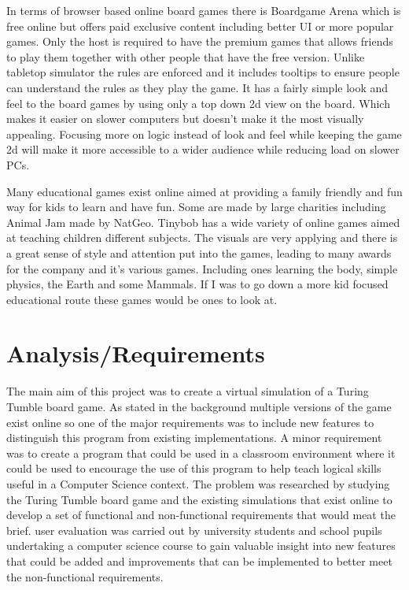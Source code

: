 \documentclass{l4proj}
\begin{document}
In terms of browser based online board games there is Boardgame Arena which is free online but offers paid exclusive content including better UI or more popular
games. Only the host is required to have the premium games that allows friends to play them together with other people that have the free version. Unlike tabletop simulator
the rules are enforced and it includes tooltips to ensure people can understand the rules as they play the game. It has a fairly simple look and feel to the board games
by using only a top down 2d view on the board. Which makes it easier on slower computers but doesn't make it the most visually appealing. 
Focusing more on logic instead of look and feel while keeping the game 2d will make it more accessible to a wider audience while reducing load on slower PCs.

Many educational games exist online aimed at providing a family friendly and fun way for kids to learn and have fun. Some are made by large charities including Animal Jam made by NatGeo. 
Tinybob has a wide variety of online games aimed at teaching children different subjects. The visuals are very applying and there is a great sense of style and attention put into the games, leading to many awards for the company 
and it's various games. Including ones learning the body, simple physics, the Earth and some Mammals. If I was to go down a more kid focused educational route
these games would be ones to look at.

\chapter{Analysis/Requirements}
The main aim of this project was to create a virtual simulation of a Turing Tumble board game. As stated in the background multiple versions of the game exist online so one of the major requirements was to include new features to distinguish this program from existing implementations. A minor requirement was to create a program that could be used in a classroom environment where it could be used to encourage the use of this program to help teach logical skills useful in a Computer Science context. The problem was researched by studying the Turing Tumble board game and the existing simulations that exist online to develop a set of functional and non-functional requirements that would meat the brief. user evaluation was carried out by university students and school pupils undertaking a computer science course to gain valuable insight into new features that could be added and improvements that can be implemented to better meet the non-functional requirements.
\end{document}
